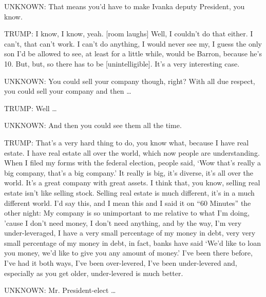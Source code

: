 UNKNOWN: That means you'd have to make Ivanka deputy President, you
know.

TRUMP: I know, I know, yeah. {[}room laughs{]} Well, I couldn't do that
either. I can't, that can't work. I can't do anything, I would never see
my, I guess the only son I'd be allowed to see, at least for a little
while, would be Barron, because he's 10. But, but, so there has to be
{[}unintelligible{]}. It's a very interesting case.

UNKNOWN: You could sell your company though, right? With all due
respect, you could sell your company and then \ldots{}

TRUMP: Well \ldots{}

UNKNOWN: And then you could see them all the time.

TRUMP: That's a very hard thing to do, you know what, because I have
real estate. I have real estate all over the world, which now people are
understanding. When I filed my forms with the federal election, people
said, `Wow that's really a big company, that's a big company.' It really
is big, it's diverse, it's all over the world. It's a great company with
great assets. I think that, you know, selling real estate isn't like
selling stock. Selling real estate is much different, it's in a much
different world. I'd say this, and I mean this and I said it on ``60
Minutes'' the other night: My company is so unimportant to me relative
to what I'm doing, 'cause I don't need money, I don't need anything, and
by the way, I'm very under-leveraged, I have a very small percentage of
my money in debt, very very small percentage of my money in debt, in
fact, banks have said `We'd like to loan you money, we'd like to give
you any amount of money.' I've been there before, I've had it both ways,
I've been over-levered, I've been under-levered and, especially as you
get older, under-levered is much better.

UNKNOWN: Mr. President-elect \ldots{}

